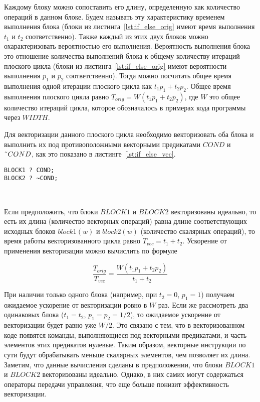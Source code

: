 \documentclass[
11pt,%
tightenlines,%
twoside,%
onecolumn,%
nofloats,%
nobibnotes,%
nofootinbib,%
superscriptaddress,%
noshowpacs,%
centertags]%
{revtex4}
\begin{document}
Каждому блоку можно сопоставить его длину, определенную как количество операций в данном блоке.
Будем называть эту характеристику временем выполнения блока (блоки из листинга~\ref{lst:if_else_orig} имеют время выполнения $t_1$ и $t_2$ соответственно).
Также каждый из этих двух блоков можно охарактеризовать вероятностью его выполнения.
Вероятность выполнения блока это отношение количества выполнений блока к общему количеству итераций плоского цикла (блоки из листинга~\ref{lst:if_else_orig} имеют вероятности выполнения $p_1$ и $p_2$ соответственно).
Тогда можно посчитать общее время выполнения одной итерации плоского цикла как $t_1 p_1 + t_2 p_2$.
Общее время выполнения плоского цикла равно $T_{orig} = W(t_1 p_1 + t_2 p_2)$, где $W$ это общее количество итераций цикла, которое обозначалось в примерах кода программы через $WIDTH$.

Для векторизации данного плоского цикла необходимо векторизовать оба блока и выполнить их под противоположными векторными предикатами $COND$ и $\text{\~{}}COND$, как это показано в листинге~\ref{lst:if_else_vec}.

\begin{lstlisting}[caption={Векторизованная конструкция $if-else$.},label={lst:if_else_vec}]
BLOCK1 ? COND;
BLOCK2 ? ~COND;
\end{lstlisting}

\

Если предположить, что блоки $BLOCK1$ и $BLOCK2$ векторизованы идеально, то есть их длина (количество векторных операций) равна длине соответствующих исходных блоков $block1(w)$ и $block2(w)$ (количество скалярных операций), то время работы векторизованного цикла равно $T_{vec} = t_1 + t_2$.
Ускорение от применения векторизации можно вычислить по формуле

\begin{equation}
\frac{T_{orig}}{T_{vec}} = \frac{W(t_1 p_1 + t_2 p_2)}{t_1 + t_2}
\end{equation}

При наличии только одного блока (например, при $t_2 = 0$, $p_1 = 1$) получаем ожидаемое ускорение от векторизации ровно в $W$ раз.
Если же рассмотреть два одинаковых блока ($t_1 = t_2$, $p_1 = p_2 = 1/2$), то ожидаемое ускорение от векторизации будет равно уже $W/2$.
Это связано с тем, что в векторизованном коде появятся команды, выполняющиеся под векторными предикатами, и часть элементов этих предикатов нулевые.
Таким образом, векторные инструкции по сути будут обрабатывать меньше скалярных элементов, чем позволяет их длина.
Заметим, что данные вычисления сделаны в предположении, что блоки $BLOCK1$ и $BLOCK2$ векторизованы идеально.
Однако, в них самих могут содержаться операторы передачи управления, что еще больше понизит эффективность векторизации.
\end{document}
